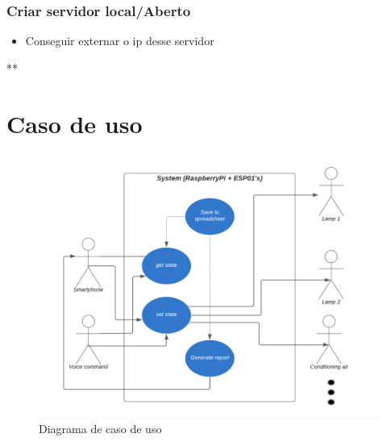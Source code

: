 \documentclass[11pt]{article}
\begin{document}
\subsubsection{Criar servidor local/Aberto}
\label{sec:org95f6c5a}
\begin{itemize}
\item Conseguir externar o ip desse servidor
\end{itemize}


**

\section{Caso de uso}
\label{sec:org9935469}
\begin{figure}[h!]
\caption{\label{fig:caso_de_uso}Diagrama de caso de uso}
\centering
\includegraphics[width=\textwidth]{diagrama_uso.png}
\end{figure}
\end{document}
